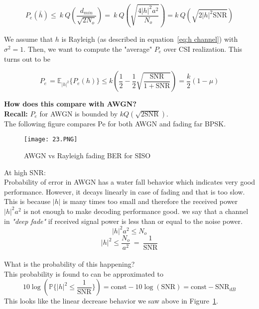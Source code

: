 \begin{equation}
    \label{eq:upper bound Pe for SISO}
    P_e\left(\bar{h}\right)\le\ k\ Q\left(\frac{d_{min}}{\sqrt{2N_o}}\right)=\ k\ Q\left(\sqrt{\frac{4\left|h\right|^2a^2}{N_o}}\right)=k\ Q\left(\sqrt{2\left|h\right|^2\text{SNR}}\right)
\end{equation}

We assume that $h$ is Rayleigh (as described in equation~\ref{eq:h channel}) with $\sigma^2= 1$.
Then, we want to compute the "average" $P_e$ over CSI realization. This turns out to be

\begin{equation}
    \label{eq:avg Pe for SISO}
    P_{e\ }=\mathbb{E}_{\left|h\right|^2}\{P_e\left(h\right)\} \le k \left(\frac{1}{2}-\frac{1}{2}\sqrt{\frac{\text{SNR}}{1+\text{SNR}}}\right) =\frac{k}{2}\left(1-\mu\right)
\end{equation}

\textbf{How does this compare with AWGN?} \\
\textbf{Recall:} $P_e$ for AWGN is bounded by $k Q(\sqrt{2\text{SNR}})$. \\
The following figure compares Pe for both AWGN and fading far BPSK.
\begin{figure}[h]
    \centering
    \texttt{[image: 23.PNG]}
    \caption{AWGN vs Rayleigh fading BER for SISO}
    \label{fig:BER SISO}
\end{figure}

At high SNR: \\
Probability of error in AWGN has a water fall behavior which indicates very good performance.
However, it decays linearly in case of fading and that is too slow.
This is because $|h|$ is many times too small and therefore the received power $|h|^2 a^2$ is not enough to make decoding performance good.
we say that a channel in \emph{"deep fade"} if received signal power is less than or equal to the noise power. \\
\[\left|h\right|^2a^2\le N_o\]
\[|h|^2\le \frac{N_o}{a^2}\ =\ \frac{1}{\text{SNR}}\] \\
What is the probability of this happening? \\
This probability is found to can be approximated to 
\begin{equation}
    \label{eq:SISO Pe}
    10\log\left(\mathbb{P}\{|h|^2\le \frac{1}{\text{SNR}}\} \right)= \text{const}-10\log\left(\text{SNR}\right)=\text{const}-\text{SNR}_{dB}
\end{equation}
This looks like the linear decrease behavior we saw above in Figure~\ref{fig:BER SISO}.

